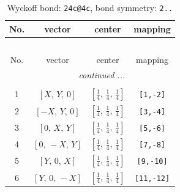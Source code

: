 \documentclass[fleqn,8pt]{jsarticle}
\begin{document}
\renewcommand{\arraystretch}{1.2}
\begin{longtable}{cccc}
\caption{Wyckoff bond: {\tt 24c@4c}, bond symmetry: {\tt 2..}}
 \\
 \hline \hline
No. & vector & center & mapping \\ \hline \endfirsthead

\multicolumn{3}{l}{\tablename\ \thetable{}} \\
 \hline \hline
No. & vector & center & mapping \\ \hline \endhead

 \hline \hline
\multicolumn{3}{r}{\footnotesize\it continued ...} \\ \endfoot

 \hline \hline
\multicolumn{3}{r}{} \\ \endlastfoot

1 & $\left[ X,\, Y,\, 0 \right]$ & $\left[ \frac{1}{4},\, \frac{1}{4},\, \frac{1}{4} \right]$ & {\tt [1,-2]} \\ \hline
2 & $\left[ - X,\, Y,\, 0 \right]$ & $\left[ \frac{1}{4},\, \frac{1}{4},\, \frac{1}{4} \right]$ & {\tt [3,-4]} \\ \hline
3 & $\left[ 0,\, X,\, Y \right]$ & $\left[ \frac{1}{4},\, \frac{1}{4},\, \frac{1}{4} \right]$ & {\tt [5,-6]} \\ \hline
4 & $\left[ 0,\, - X,\, Y \right]$ & $\left[ \frac{1}{4},\, \frac{1}{4},\, \frac{1}{4} \right]$ & {\tt [7,-8]} \\ \hline
5 & $\left[ Y,\, 0,\, X \right]$ & $\left[ \frac{1}{4},\, \frac{1}{4},\, \frac{1}{4} \right]$ & {\tt [9,-10]} \\ \hline
6 & $\left[ Y,\, 0,\, - X \right]$ & $\left[ \frac{1}{4},\, \frac{1}{4},\, \frac{1}{4} \right]$ & {\tt [11,-12]} \\
\end{longtable}
\renewcommand{\arraystretch}{1.2}
\end{document}
